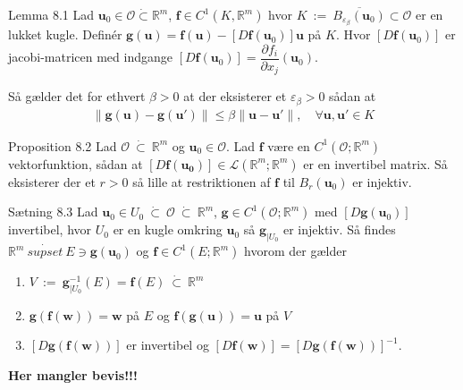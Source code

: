 \begin{boks}{Lemma 8.1}
  Lad $\mathbf{u}_0 \in \mathcal{O} \dot{\subset} \mathbb{R}^m$, $\mathbf{f} \in C^1(K, \mathbb{R}^m)$ hvor $K \ := \ \overline{B_{\varepsilon_\beta}(\mathbf{u}_0)} \subset \mathcal{O}$ er en lukket kugle.
  Definér $\mathbf{g}(\mathbf{u}) = \mathbf{f}(\mathbf{u}) - [D\mathbf{f}(\mathbf{u}_0)]\mathbf{u}$ på $K$.
  Hvor $[D\mathbf{f}(\mathbf{u}_0)]$ er jacobi-matricen med indgange $[D\mathbf{f}(\mathbf{u}_0)] = \dfrac{\partial f_i}{\partial x_j}(\mathbf{u}_0)$.

  Så gælder det for ethvert $\beta > 0$ at der eksisterer et $\varepsilon_\beta > 0$ sådan at
  \begin{align*}
    \| \mathbf{g}(\mathbf{u}) - \mathbf{g}(\mathbf{u}') \| \leq \beta \| \mathbf{u} - \mathbf{u}' \|, \quad \forall \mathbf{u}, \mathbf{u}' \in K
  \end{align*}
\end{boks}

\begin{boks}{Proposition 8.2}
  Lad $\mathcal{O} \ \dot{\subset} \ \mathbb{R}^m$ og $\mathbf{u}_0 \in \mathcal{O}$. Lad $\mathbf{f}$ være en $C^1(\mathcal{O};\mathbb{R}^m)$ vektorfunktion, sådan at $[D\mathbf{f(\mathbf{u}_0)}] \in \mathcal{L}(\mathbb{R}^m; \mathbb{R}^m)$ er en invertibel matrix.
  Så eksisterer der et $r > 0$ så lille at restriktionen af $\mathbf{f}$ til $B_r(\mathbf{u}_0)$ er injektiv.
\end{boks}

\begin{boks}{Sætning 8.3}
  Lad $\mathbf{u}_0 \in U_0 \ \dot{\subset} \ \mathcal{O} \ \dot{\subset} \  \mathbb{R}^m$, $\mathbf{g} \in C^1(\mathcal{O}; \mathbb{R}^m)$ med $[D\mathbf{g}(\mathbf{u}_0)]$ invertibel, hvor $U_0$ er en kugle omkring $\mathbf{u}_0$ så $\mathbf{g}_{|U_0}$ er injektiv.
  Så findes $\mathbb{R}^m \ \dot{supset} \ E \ni \mathbf{g}(\mathbf{u}_0)$ og $\mathbf{f} \in C^1(E;\mathbb{R}^m)$ hvorom der gælder
  \begin{enumerate}[label = (\roman*)]
    \item $V \ := \ \mathbf{g}^{-1}_{|U_0}(E) = \mathbf{f}(E) \ \dot{\subset} \ \mathbb{R}^m$
    \item $\mathbf{g}(\mathbf{f}(\mathbf{w})) = \mathbf{w}$ på $E$ og $\mathbf{f}(\mathbf{g}(\mathbf{u})) = \mathbf{u}$ på $V$
    \item $[D\mathbf{g}(\mathbf{f}(\mathbf{w}))]$ er invertibel og $[D\mathbf{f}(\mathbf{w})] = [D\mathbf{g}(\mathbf{f}(\mathbf{w}))]^{-1}$.
  \end{enumerate}
\end{boks}

\textbf{Her mangler bevis!!!}
